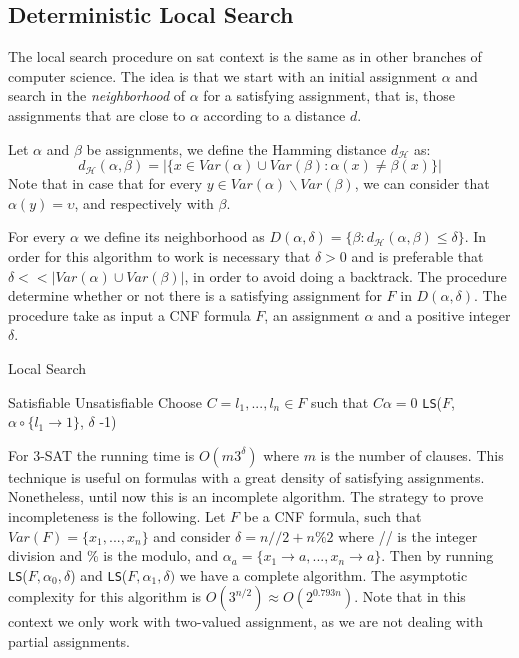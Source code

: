 \subsection{Deterministic Local Search}

The local search procedure on sat context is the same as in other branches of computer science. The idea is that we start with an initial assignment $\alpha$ and search in the \emph{neighborhood} of $\alpha$ for a satisfying assignment, that is, those assignments that are close to $\alpha$ according to a distance $d$. 

\begin{definition}
  Let $\alpha$ and $\beta$ be assignments, we define the Hamming distance $d_\mathcal{H}$ as:
  $$d_\mathcal{H}(\alpha,\beta) =  | \{ x \in Var(\alpha) \cup Var(\beta) : \alpha(x) \ne \beta(x) \} |$$
  Note that in case that for every $y \in Var(\alpha) \backslash Var(\beta)$, we can  consider that $\alpha(y) = \upsilon$, and respectively with $\beta$.
\end{definition}

For every $\alpha$ we define its neighborhood as $D(\alpha,\delta) = \{\beta : d_\mathcal{H}(\alpha,\beta) \le \delta\}$. In order for this algorithm to work is necessary that $\delta > 0$ and is preferable that $\delta << |Var(\alpha) \cup Var(\beta)|$, in order to avoid doing a backtrack. The procedure determine whether or not there is a satisfying assignment for $F$ in $D(\alpha,\delta)$. The procedure take as input a CNF formula $F$, an assignment $\alpha$ and a positive integer $\delta$.

\begin{algorithm}
  \caption{Local Search\cite{schoning2013satisfiability}}\label{ds}
  \begin{algorithmic}[1]
     \Return Satisfiable
    \EndIf
     \Return Unsatisfiable 
    \EndIf
    \State Choose $C={l_1,...,l_n}\in F$ such that $C\alpha=0$
  \State \Return \texttt{LS}($F$, $\alpha\circ\{l_1 \to 1\}$, $\delta$ -1)
  \EndFor
  \EndProcedure
\end{algorithmic}
\end{algorithm}


For 3-SAT the running time is $O(m3^\delta)$ where $m$ is the number of clauses. This technique is useful on formulas with a great density of satisfying assignments. Nonetheless, until now this is an incomplete algorithm. The strategy to prove incompleteness is the following. Let $F$ be a CNF formula, such that $Var(F)=\{x_1,...,x_n\}$ and consider $\delta = n//2+n\%2$ where // is the integer division and \% is the modulo, and $\alpha_a = \{x_1 \to a,...,x_n\to a\}$. Then by running \texttt{LS}($F,\alpha_0,\delta$) and \texttt{LS}($F,\alpha_1,\delta)$ we have a complete algorithm. The asymptotic complexity for this algorithm is $O(3^{n/2}) \approx O(2^{0.793n})$. Note that in this context we only work with two-valued assignment, as we are not dealing with partial assignments.\\

